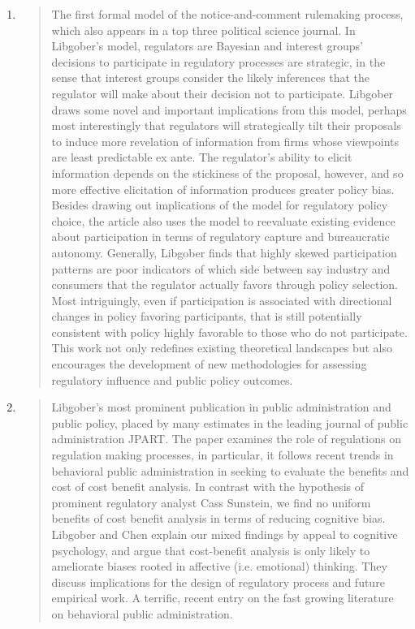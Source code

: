 \documentclass[12pt]{article}
\begin{document}
\begin{enumerate}
\item {}

\begin{quote}
The first formal model of the notice-and-comment rulemaking process, which also appears in a top three political science journal. In Libgober's model, regulators are Bayesian and interest groups' decisions to participate in regulatory processes are strategic, in the sense that interest groups consider the likely inferences that the regulator will make about their decision not to participate. Libgober draws some novel and important implications from this model, perhaps most interestingly that regulators will strategically tilt their proposals to induce more revelation of information from firms whose viewpoints are least predictable ex ante. The regulator's ability to elicit information depends on the stickiness of the proposal, however, and so more effective elicitation of information produces greater policy bias. Besides drawing out implications of the model for regulatory policy choice, the article also uses the model to reevaluate existing evidence about participation in terms of regulatory capture and bureaucratic autonomy. Generally, Libgober finds that highly skewed participation patterns are poor indicators of which side between say industry and consumers that the regulator actually favors through policy selection. Most intriguingly, even if participation is associated with directional changes in policy favoring participants, that is still potentially consistent with policy highly favorable to those who do not participate. This work not only redefines existing theoretical landscapes but also encourages the development of new methodologies for assessing regulatory influence and public policy outcomes.
\end{quote}

\item {}

\begin{quote}
Libgober's most prominent publication in public administration and public policy, placed by many estimates in the leading journal of public administration JPART. The paper examines the role of regulations on regulation making processes, in particular, it follows recent trends in behavioral public administration in seeking to evaluate the benefits and cost of cost benefit analysis. In contrast with the hypothesis of prominent regulatory analyst Cass Sunstein, we find no uniform benefits of cost benefit analysis in terms of reducing cognitive bias. Libgober and Chen explain our mixed findings by appeal to cognitive psychology, and argue that cost-benefit analysis is only likely to ameliorate biases rooted in affective (i.e. emotional) thinking. They discuss implications for the design of regulatory process and future empirical work. A terrific, recent entry on the fast growing literature on behavioral public administration.
\end{quote}


\end{enumerate}
\end{document}
